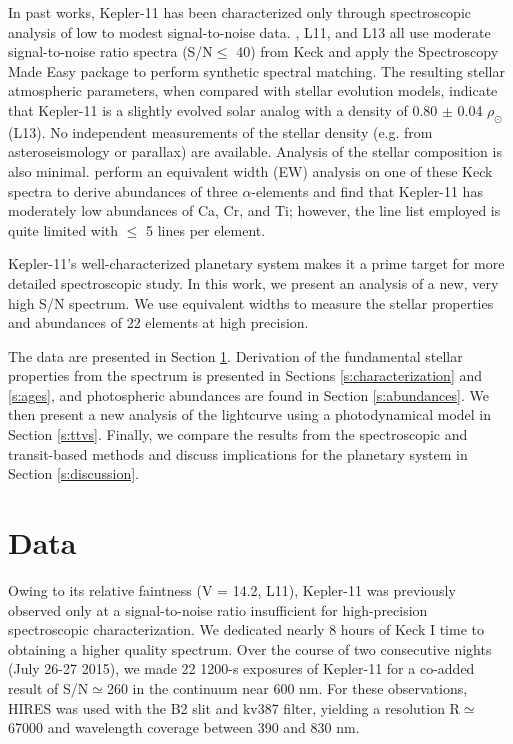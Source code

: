 \documentclass[oneside]{emulateapj}
\begin{document}
In past works, Kepler-11 has been characterized only through spectroscopic analysis of low to modest signal-to-noise data. \citet{Rowe2014}, L11, and L13 all use moderate signal-to-noise ratio spectra (S/N$\leq$ 40) from Keck and apply the Spectroscopy Made Easy package \citep[SME,][]{Valenti1996} to perform synthetic spectral matching. The resulting stellar atmospheric parameters, when compared with stellar evolution models, indicate that Kepler-11 is a slightly evolved solar analog with a density of 0.80 $\pm$ 0.04 $\rho_{\odot}$ (L13). No independent measurements of the stellar density (e.g. from asteroseismology or parallax) are available. Analysis of the stellar composition is also minimal. \citet{Adibekyan2012b} perform an equivalent width (EW) analysis on one of these Keck spectra to derive abundances of three $\alpha$-elements and find that Kepler-11 has moderately low abundances of Ca, Cr, and Ti; however, the line list employed is quite limited with $\leq$ 5 lines per element.

Kepler-11's well-characterized planetary system makes it a prime target for more detailed spectroscopic study. In this work, we present an analysis of a new, very high S/N spectrum. We use equivalent widths to measure the stellar properties and abundances of 22 elements at high precision.

The data are presented in Section \ref{s:data}. Derivation of the fundamental stellar properties from the spectrum is presented in Sections \ref{s:characterization} and \ref{s:ages}, and photospheric abundances are found in Section \ref{s:abundances}. We then present a new analysis of the \Kepler lightcurve using a photodynamical model in Section \ref{s:ttvs}. Finally, we compare the results from the spectroscopic and transit-based methods and discuss implications for the planetary system in Section \ref{s:discussion}.


\section{Data}
\label{s:data}

Owing to its relative faintness (V = 14.2, L11), Kepler-11 was previously observed only at a signal-to-noise ratio insufficient for high-precision spectroscopic characterization. We dedicated nearly 8 hours of Keck I time to obtaining a higher quality spectrum. Over the course of two consecutive nights (July 26-27 2015), we made 22 1200-s exposures of Kepler-11 for a co-added result of S/N$\simeq$260 in the continuum near 600 nm. For these observations, HIRES was used with the B2 slit and kv387 filter, yielding a resolution R$\simeq$67000 and wavelength coverage between 390 and 830 nm.
\end{document}
